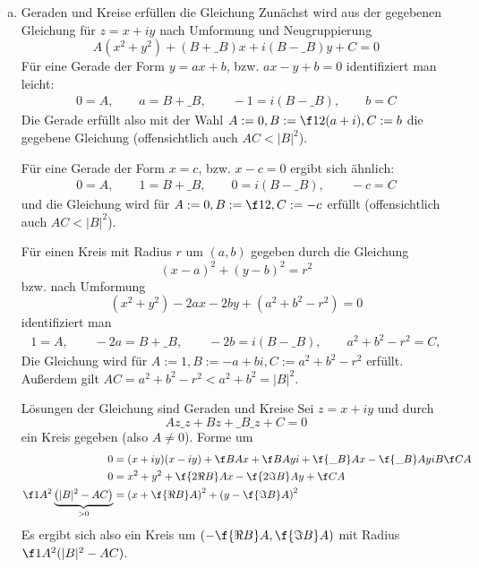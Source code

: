 \documentclass{mywork}
\begin{document}
	\newpage
	\begin{aufgabe}
		\begin{enumerate}[a)]
			\item 
				\begin{seg}{Geraden und Kreise erfüllen die Gleichung}
					Zunächst wird aus der gegebenen Gleichung für $z=x+iy$ nach Umformung und Neugruppierung
					\[
						A(x^2+y^2) + (B+\_B)x + i(B-\_B)y + C = 0
					\]
					Für eine Gerade der Form $y=ax+b$, bzw. $ax -y + b = 0$ identifiziert man leicht:
					\begin{align*}
						0 = A,\qquad a = B + \_B, \qquad -1 = i(B-\_B), \qquad b = C
					\end{align*}
					Die Gerade erfüllt also mit der Wahl $A:=0, B:=\f 12(a+i), C:= b$ die gegebene Gleichung (offensichtlich auch $AC<|B|^2$).
					
					Für eine Gerade der Form $x=c$, bzw. $x-c=0$ ergibt sich ähnlich:
					\begin{align*}
						0 = A,\qquad 1 = B + \_B, \qquad 0 = i(B-\_B), \qquad -c = C
					\end{align*}
					und die Gleichung wird für $A:=0, B:=\f 12, C:= -c$ erfüllt (offensichtlich auch $AC<|B|^2$).

					Für einen Kreis mit Radius $r$ um $(a,b)$ gegeben durch die Gleichung
					\[
						(x-a)^2 + (y-b)^2 = r^2
					\]
					bzw. nach Umformung
					\[
						(x^2+y^2) - 2ax - 2by +(a^2+b^2-r^2) = 0
					\]
					identifiziert man
					\begin{align*}
						1 = A,\qquad  -2a = B + \_B, \qquad -2b = i(B-\_B), \qquad a^2+b^2-r^2 = C,
					\end{align*}
					Die Gleichung wird für $A:=1, B:= -a +bi, C:=a^2+b^2-r^2$ erfüllt.
					Außerdem gilt $AC = a^2+b^2-r^2 < a^2+b^2 = |B|^2$.
				\end{seg}
				\begin{seg}{Lösungen der Gleichung sind Geraden und Kreise}
					Sei $z=x+iy$ und durch
					\[
						Az\_z + Bz + \_B\_z + C = 0
					\]
					ein Kreis gegeben (also $A\neq 0$).
					Forme um
					\begin{align*}
						0 &= (x+iy)(x-iy) + \f BA x + \f BA yi + \f{\_B}A x - \f{\_B}Ayi B \f CA\\
					    0 &= x^2+y^2 + \f {2 \Re B}A x - \f {2\Im B}A y + \f CA\\
						  \f 1{A^2}\underbrace{\left(|B|^2 - AC\right)}_{>0}&= \left(x+\f {\Re B}A\right)^2 + \left(y-\f {\Im B}A\right)^2  
					\end{align*}
					Es ergibt sich also ein Kreis um $( -\f{\Re B}A, \f {\Im B}A)$ mit Radius $\f 1{A^2}(|B|^2-AC)$.


\end{seg}
\end{enumerate}
\end{aufgabe}
\end{document}
